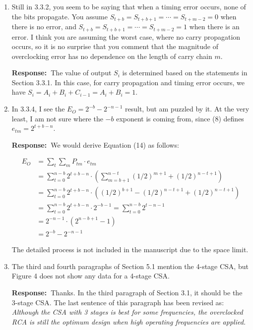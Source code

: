 \documentclass[a4paper, 11pt]{article}
\def\Response{\noindent \textbf{Response:~}}
\newcommand{\Question}[1]{\textcolor[rgb]{0.51,0.00,0.00}{#1}}
\newcommand{\PaperText}[1]{\emph{#1}}
\begin{document}
\begin{enumerate}
  \item \Question{Still in 3.3.2, you seem to be saying that when a timing error occurs, none of the bits propagate. You assume $S_{t+b}=S_{t+b+1}=\cdots=S_{t+m-2}=0$ when there is no error, and $S_{t+b}=S_{t+b+1}=\cdots=S_{t+m-2}=1$ when there is an error. I think you are assuming the worst case, where no carry propagation occurs, so it is no surprise that you comment that the magnitude of overclocking error has no dependence on the length of carry chain $m$.}
      
      \Response The value of output $S_i$ is determined based on the statements in Section 3.3.1. In this case, for carry propagation and timing error occurs, we have $S_i=A_i+B_i+C_{i-1}=A_i+B_i=1$. 
      
  \item \Question{In 3.3.4, I see the $E_O = 2^{-b}-2^{-n-1}$ result, but am puzzled by it.  At the very least, I am not sure where the $-b$ exponent is coming from, since (8) defines $e_{tm} = 2^{t+b-n}$.}
      
      \Response We would derive Equation (14) as follows:
      
      \begin{align*}
        E_O&=\sum_t\sum_m P_{tm}\cdot e_{tm}\\ &=\sum_{t=0}^{n-b}2^{t+b-n}\cdot\left(\sum_{m=b+1}^{n-t}(1/2)^{m+1}+(1/2)^{n-t+1}\right)\\
        &=\sum_{t=0}^{n-b}2^{t+b-n}\cdot\left((1/2)^{b+1}-(1/2)^{n-t+1}+(1/2)^{n-t+1}\right)\\
        &=\sum_{t=0}^{n-b}2^{t+b-n}\cdot2^{-b-1}=\sum_{t=0}^{n-b}2^{t-n-1}\\
        &=2^{-n-1}\cdot\left(2^{n-b+1}-1\right)\\
        &=2^{-b}-2^{-n-1}
      \end{align*}
      
      The detailed process is not included in the manuscript due to the space limit.
      
  \item \Question{The third and fourth paragraphs of Section 5.1 mention the 4-stage CSA, but Figure 4 does not show any data for a 4-stage CSA.}
      
      \Response Thanks. In the third paragraph of Section 3.1, it should be the 3-stage CSA. The last sentence of this paragraph has been revised as:\\
      
      \PaperText{Although the CSA with 3 stages is best for some frequencies, the overclocked RCA is still the optimum design when high operating frequencies are applied.}\\
      

\end{enumerate}
\end{document}
